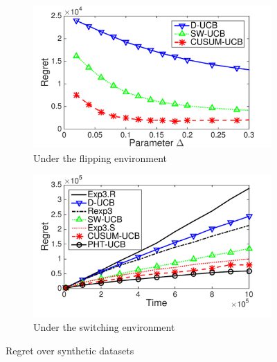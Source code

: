 \documentclass[letterpaper]{article} %
\begin{document}
\begin{figure}[t]
\centering
\begin{subfigure}[b]{0.45\textwidth}
    \includegraphics[width=\textwidth]{delta}
     \caption{
 Under the flipping environment}\label{subfig:flip}
\end{subfigure}
\begin{subfigure}[b]{0.45\textwidth}
    \includegraphics[width=\textwidth]{SWEN_all_NIPS}
     \caption{
Under the switching environment}\label{subfig:switch}
\end{subfigure}
\caption{Regret over synthetic datasets}
\label{fig:synthetic}
\end{figure}

\end{document}
